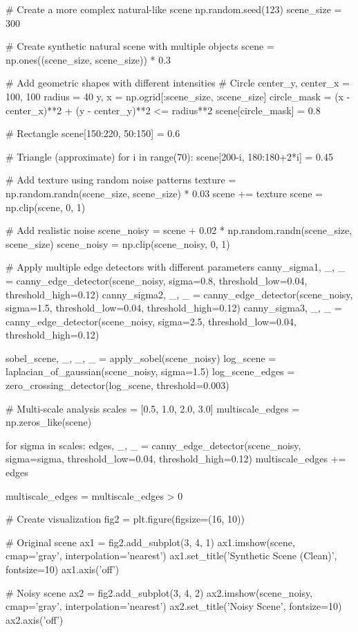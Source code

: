 \documentclass[a4paper, 11pt]{article}
\begin{document}
\begin{pycode}
# Create a more complex natural-like scene
np.random.seed(123)
scene_size = 300

# Create synthetic natural scene with multiple objects
scene = np.ones((scene_size, scene_size)) * 0.3

# Add geometric shapes with different intensities
# Circle
center_y, center_x = 100, 100
radius = 40
y, x = np.ogrid[:scene_size, :scene_size]
circle_mask = (x - center_x)**2 + (y - center_y)**2 <= radius**2
scene[circle_mask] = 0.8

# Rectangle
scene[150:220, 50:150] = 0.6

# Triangle (approximate)
for i in range(70):
    scene[200-i, 180:180+2*i] = 0.45

# Add texture using random noise patterns
texture = np.random.randn(scene_size, scene_size) * 0.03
scene += texture
scene = np.clip(scene, 0, 1)

# Add realistic noise
scene_noisy = scene + 0.02 * np.random.randn(scene_size, scene_size)
scene_noisy = np.clip(scene_noisy, 0, 1)

# Apply multiple edge detectors with different parameters
canny_sigma1, _, _ = canny_edge_detector(scene_noisy, sigma=0.8, threshold_low=0.04, threshold_high=0.12)
canny_sigma2, _, _ = canny_edge_detector(scene_noisy, sigma=1.5, threshold_low=0.04, threshold_high=0.12)
canny_sigma3, _, _ = canny_edge_detector(scene_noisy, sigma=2.5, threshold_low=0.04, threshold_high=0.12)

sobel_scene, _, _, _ = apply_sobel(scene_noisy)
log_scene = laplacian_of_gaussian(scene_noisy, sigma=1.5)
log_scene_edges = zero_crossing_detector(log_scene, threshold=0.003)

# Multi-scale analysis
scales = [0.5, 1.0, 2.0, 3.0]
multiscale_edges = np.zeros_like(scene)

for sigma in scales:
    edges, _, _ = canny_edge_detector(scene_noisy, sigma=sigma, threshold_low=0.04, threshold_high=0.12)
    multiscale_edges += edges

multiscale_edges = multiscale_edges > 0

# Create visualization
fig2 = plt.figure(figsize=(16, 10))

# Original scene
ax1 = fig2.add_subplot(3, 4, 1)
ax1.imshow(scene, cmap='gray', interpolation='nearest')
ax1.set_title('Synthetic Scene (Clean)', fontsize=10)
ax1.axis('off')

# Noisy scene
ax2 = fig2.add_subplot(3, 4, 2)
ax2.imshow(scene_noisy, cmap='gray', interpolation='nearest')
ax2.set_title('Noisy Scene', fontsize=10)
ax2.axis('off')


\end{pycode}
\end{document}
